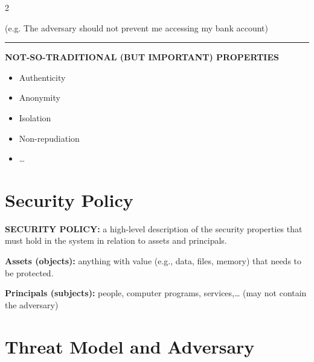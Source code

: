 \documentclass[a4paper,9pt]{extarticle}
\newcommand{\separator}{
\vspace{2pt}
\hrule
\vspace{3pt}
}
\begin{document}
\begin{multicols}{2}
\begin{itemize}
(e.g. The adversary should not prevent me accessing my bank account)

\end{itemize}


\separator


\textbf{NOT-SO-TRADITIONAL (BUT IMPORTANT) PROPERTIES}

\begin{itemize}

\item Authenticity

\item Anonymity

\item Isolation

\item Non-repudiation

\item \dots

\end{itemize}



\section{Security Policy}


\begin{definition}

\textbf{SECURITY POLICY:} a high-level description of the security properties that must
hold in the system in relation to assets and principals.

\end{definition}


\begin{definition}

\textbf{Assets (objects):} anything with value (e.g., data, files, memory) that needs to be protected.

\end{definition}


\begin{definition}

\textbf{Principals (subjects):} people, computer programs, services,\dots{} (may not contain the adversary)

\end{definition}



\section{Threat Model and Adversary}



\end{multicols}
\end{document}
